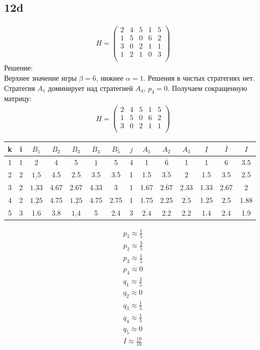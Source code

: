 \documentclass{article}
\begin{document}
\subsection*{12d}
\begin{gather*}H = \left(\begin{matrix}
2 & 4 & 5 & 1 & 5\\
1 & 5 & 0 & 6 & 2\\
3 & 0 & 2 & 1 & 1\\
1 & 2 & 1 & 0 & 3\\
\end{matrix}\right)\end{gather*}
Решение:\\
Верхнее значение игры $\beta=6$, нижнее $\alpha=1$. Решения в чистых стратегиях нет. Стратегия $A_1$ доминирует над стратегией $A_4$, $p_4 = 0$. Получаем сокращенную матрицу:\\
\begin{gather*}H = \left(\begin{matrix}
2 & 4 & 5 & 1 & 5\\
1 & 5 & 0 & 6 & 2\\
3 & 0 & 2 & 1 & 1\\
\end{matrix}\right)\end{gather*}
\begin{tabular}{||c||c||c|c|c|c|c||c||c|c|c||c||c||c||}
\hline
k & i & $B_1$ & $B_2$ & $B_3$ & $B_4$ & $B_5$ & $j$ & $A_1$ & $A_2$ & $A_3$ &$\underline{I}$ & $\overline{I}$ & $I$\\
\hline
1 & 1 & 2 & 4 & 5 & $\underline{1}$ & 5 & 4 & 1 & $\overline{6}$ & 1 & 1 & 6 & 3.5\\
\hline
2 & 2 & $\underline{1.5}$ & 4.5 & 2.5 & 3.5 & 3.5 & 1 & 1.5 & $\overline{3.5}$ & 2 & 1.5 & 3.5 & 2.5\\
\hline
3 & 2 & $\underline{1.33}$ & 4.67 & 2.67 & 4.33 & 3 & 1 & 1.67 & $\overline{2.67}$ & 2.33 & 1.33 & 2.67 & 2\\
\hline
4 & 2 & $\underline{1.25}$ & 4.75 & $\underline{1.25}$ & 4.75 & 2.75 & 1 & 1.75 & 2.25 & $\overline{2.5}$ & 1.25 & 2.5 & 1.88\\
\hline
5 & 3 & 1.6 & 3.8 & $\underline{1.4}$ & 5 & 2.4 & 3 & $\overline{2.4}$ & 2.2 & 2.2 & 1.4 & 2.4 & 1.9\\
\hline
\end{tabular}
\begin{gather*}
p_1 \approx \frac{1}{5}\\
p_2 \approx \frac{3}{5}\\
p_3 \approx \frac{1}{5}\\
p_4 \approx 0\\
q_1 \approx \frac{3}{5}\\
q_2 \approx 0\\
q_3 \approx \frac{1}{5}\\
q_4 \approx \frac{1}{5}\\
q_5 \approx 0\\
I \approx \frac{19}{10}
\end{gather*}
\end{document}
